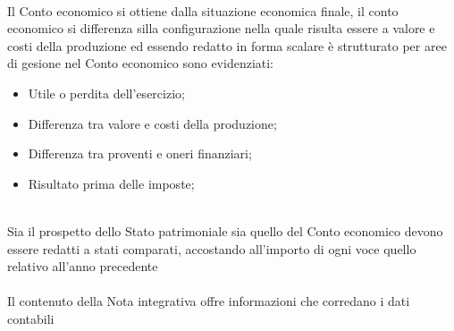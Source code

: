 \documentclass{report}
\begin{document}
\\
Il Conto economico si ottiene dalla situazione economica finale, il conto economico si differenza silla configurazione nella quale risulta essere a valore e costi della produzione ed essendo redatto in forma scalare è strutturato per aree di gesione nel Conto economico sono evidenziati:
\\
\begin{itemize}
  \item{Utile o perdita dell'esercizio;}
  \item{Differenza tra valore e costi della produzione;}
  \item{Differenza tra proventi e oneri finanziari;}
  \item{Risultato prima delle imposte;}
\end{itemize}
\\
Sia il prospetto dello Stato patrimoniale sia quello del Conto economico devono essere redatti a stati comparati, accostando all'importo di ogni voce quello relativo all'anno precedente
\\
\\
Il contenuto della Nota integrativa offre informazioni che corredano i dati contabili
\end{document}
